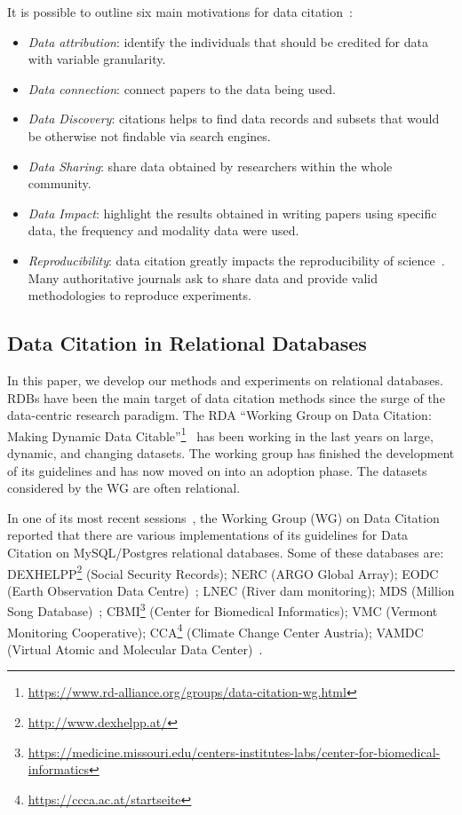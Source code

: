 It is possible to outline six main motivations for data citation~\citep{Silvello18jasist}:
\begin{itemize}
	\item \emph{Data attribution}: identify the individuals that should be credited for data with variable granularity.
	\item \emph{Data connection}: connect papers to the data being used.
    \item \emph{Data Discovery}: citations helps to find data records and subsets that would be otherwise not findable via search engines.
    \item \emph{Data Sharing}: share data obtained by researchers within the whole community. 
    \item \emph{Data Impact}: highlight the results obtained in writing papers using specific data, the frequency and modality data were used.
    \item \emph{Reproducibility}: data citation greatly impacts the reproducibility of science~\citep{baggerly2010disclose}. Many authoritative journals ask to share data and provide valid methodologies to reproduce experiments.
\end{itemize}

\subsection{Data Citation in Relational Databases}
In this paper, we develop our methods and experiments on relational databases. RDBs have been the main target of data citation methods since the surge of the data-centric research paradigm. 
The RDA ``Working Group on Data Citation: Making Dynamic Data Citable''\footnote{\url{https://www.rd-alliance.org/groups/data-citation-wg.html}}~\citep{RauberEtAl2016} has been working in the last years on large, dynamic, and changing datasets. The working group has finished the development of its guidelines and has now moved on into an adoption phase. 
The datasets considered by the WG are often relational.

In one of its most recent sessions~\citep{rauber2015data}, the Working Group (WG) on Data Citation reported that there are various implementations of its guidelines for Data Citation on MySQL/Postgres relational databases. 
Some of these databases are: DEXHELPP\footnote{\url{http://www.dexhelpp.at/}} (Social Security Records); NERC (ARGO Global Array); EODC (Earth Observation Data Centre)~\citep{gosswein2019data}; LNEC (River dam monitoring); MDS (Million Song Database)~\citep{bertin2011million}; CBMI\footnote{\url{https://medicine.missouri.edu/centers-institutes-labs/center-for-biomedical-informatics}} (Center for Biomedical Informatics); VMC (Vermont Monitoring Cooperative); CCA\footnote{\url{https://ccca.ac.at/startseite}} (Climate Change Center Austria); VAMDC (Virtual Atomic and Molecular Data Center)~\citep{Dubernet_2016, ZwolfEtAl2016}.

